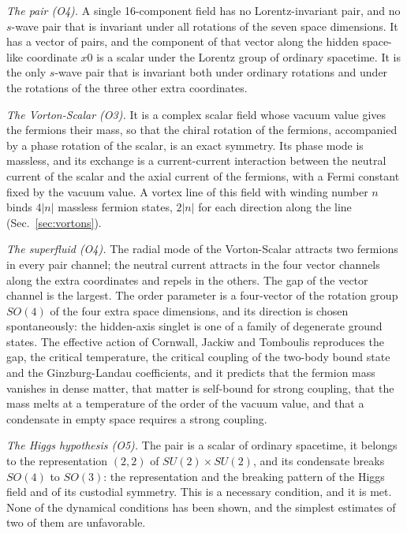 \emph{The pair (O4).} A single 16-component field has no Lorentz-invariant pair, and no $s$-wave pair
that is invariant under all rotations of the seven space dimensions. It has a vector of pairs, and the
component of that vector along the hidden space-like coordinate $x0$ is a scalar under the Lorentz
group of ordinary spacetime. It is the only $s$-wave pair that is invariant both under ordinary
rotations and under the rotations of the three other extra coordinates.

\emph{The Vorton-Scalar (O3).} It is a complex scalar field whose vacuum value gives the fermions
their mass, so that the chiral rotation of the fermions, accompanied by a phase rotation of the scalar,
is an exact symmetry. Its phase mode is massless, and its exchange is a current-current interaction
between the neutral current of the scalar and the axial current of the fermions, with a Fermi constant
fixed by the vacuum value. A vortex line of this field with winding number $n$ binds $4|n|$ massless
fermion states, $2|n|$ for each direction along the line (Sec.~\ref{sec:vortons}).

\emph{The superfluid (O4).} The radial mode of the Vorton-Scalar attracts two fermions in every pair
channel; the neutral current attracts in the four vector channels along the extra coordinates and
repels in the others. The gap of the vector channel is the largest. The order parameter is a
four-vector of the rotation group $SO(4)$ of the four extra space dimensions, and its direction is
chosen spontaneously: the hidden-axis singlet is one of a family of degenerate ground states. The
effective action of Cornwall, Jackiw and Tomboulis reproduces the gap, the critical temperature, the
critical coupling of the two-body bound state and the Ginzburg-Landau coefficients, and it predicts
that the fermion mass vanishes in dense matter, that matter is self-bound for strong coupling, that the
mass melts at a temperature of the order of the vacuum value, and that a condensate in empty space
requires a strong coupling.

\emph{The Higgs hypothesis (O5).} The pair is a scalar of ordinary spacetime, it belongs to the
representation $(2,2)$ of $SU(2)\times SU(2)$, and its condensate breaks $SO(4)$ to $SO(3)$: the
representation and the breaking pattern of the Higgs field and of its custodial symmetry. This is a
necessary condition, and it is met. None of the dynamical conditions has been shown, and the simplest
estimates of two of them are unfavorable.

